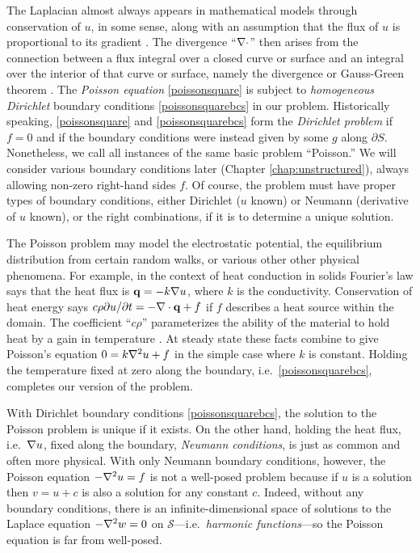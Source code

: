 The Laplacian almost always appears in mathematical models through conservation of $u$, in some sense, along with an assumption that the flux of $u$ is proportional to its gradient \citep{Ockendonetal2003}.  The divergence ``$\nabla\cdot$'' then arises from the connection between a flux integral over a closed curve or surface and an integral over the interior of that curve or surface, namely the divergence or Gauss-Green theorem \citep[Appendix C]{Evans}.  The \emph{Poisson equation} \eqref{poissonsquare} is subject to \emph{homogeneous Dirichlet} boundary conditions \eqref{poissonsquarebcs} in our problem.  Historically speaking, \eqref{poissonsquare} and \eqref{poissonsquarebcs} form the \emph{Dirichlet problem} if $f=0$ and if the boundary conditions were instead given by some $g$ along $\partial S$.  Nonetheless, we call all instances of the same basic problem ``Poisson.''  We will consider various boundary conditions later (Chapter \ref{chap:unstructured}), always allowing non-zero right-hand sides $f$.  Of course, the problem must have proper types of boundary conditions, either Dirichlet ($u$ known) or Neumann (derivative of $u$ known), or the right combinations, if it is to determine a unique solution.

The Poisson problem may model the electrostatic potential, the equilibrium distribution from certain random walks, or various other other physical phenomena.  For example, in the context of heat conduction in solids Fourier's law says that the heat flux is $\mathbf{q} = -k \nabla u$, where $k$ is the conductivity.  Conservation of heat energy says $c\rho \partial u/\partial t = - \nabla\cdot\mathbf{q} + f$ if $f$ describes a heat source within the domain.  The coefficient ``$c\rho$'' parameterizes the ability of the material to hold heat by a gain in temperature \citep{Ockendonetal2003}.  At steady state these facts combine to give Poisson's equation $0 = k \nabla^2 u + f$ in the simple case where $k$ is constant.  Holding the temperature fixed at zero along the boundary, i.e.~\eqref{poissonsquarebcs}, completes our version of the problem.

With Dirichlet boundary conditions \eqref{poissonsquarebcs}, the solution to the Poisson problem is unique if it exists.  On the other hand, holding the heat flux, i.e.~$\nabla u$, fixed along the boundary, \emph{Neumann conditions}, is just as common and often more physical.  With only Neumann boundary conditions, however, the Poisson equation $-\nabla^2 u = f$ is not a well-posed problem because if $u$ is a solution then $v=u+c$ is also a solution for any constant $c$.  Indeed, without any boundary conditions, there is an infinite-dimensional space of solutions to the Laplace equation $-\nabla^2 w = 0$ on $\mathcal{S}$---i.e.~\emph{harmonic functions}---so the Poisson equation is far from well-posed.


